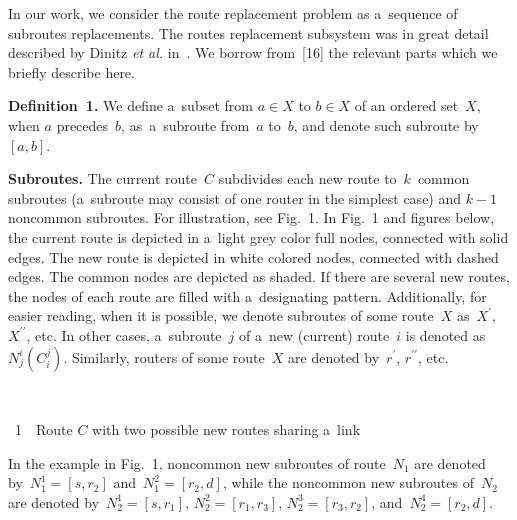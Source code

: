 \begin{multicols}{2}
In our work, we consider the route replacement problem as a~sequence of 
subroutes replacements.
The routes replacement subsystem was in great detail described by Dinitz 
\textit{et al.} in~\cite{dinitz_dependence_2017}. We borrow
from~[16] the relevant parts which we briefly describe here.

\smallskip

\noindent
\textbf{Definition~1.} We  define a~subset from $a\in X$ to $b\in X$ of an ordered
set~$X$, when $a$ precedes~$b$, as~a~subroute from~$a$ to~$b$, and denote such subroute by
$[a,b]$.

\smallskip

 

\textbf{Subroutes.} The current route~$C$ subdivides each new route 
to~$k$~common subroutes (a~subroute may consist of one router in the simplest case) 
and $k-1$ noncommon subroutes. 
For illustration, see Fig.~1.
In Fig.~1 and figures below, the current route is depicted
in a~light grey color full nodes, connected with
solid edges. The new route is depicted in white colored nodes, connected with
dashed edges. The common nodes are depicted as shaded. 
If there are several new
routes, the nodes of each route are filled with a~designating pattern. 
Additionally, for easier reading,
when it is possible, we denote subroutes of some route~$X$ as~$X^\prime$, $X^{\prime\prime}$, 
etc. In other cases, a~subroute~$j$
of a~new (current) route~$i$ is denoted as $N_j^i (C_i^j)$. 
Similarly, routers of some route~$X$ are denoted by~$r^\prime$,
$r^{\prime\prime}$, etc.

 { \begin{center}  %
\vspace*{1pt}
 \mbox{%
 \epsfxsize=78.631mm 
 }


\vspace*{3pt}


\noindent
{{\figurename~1}\ \ \small{Route $C$ with two possible new routes sharing a~link}}
\end{center}
}

\vspace*{6pt}






In the example in Fig.~1, 
noncommon new subroutes 
of route~$N_1$ are denoted by~$N^1_1=[s,r_2]$ and~$N^2_1=[r_2,d]$, while the noncommon new 
subroutes of~$N_2$ are denoted by~$N^1_2=[s,r_1]$, $N^2_2=[r_1,r_3]$, 
$N^3_2=[r_3,r_2]$, and~$N^4_2=[r_2,d]$. 


\end{multicols}
